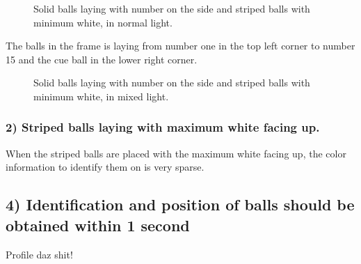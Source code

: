 \begin{figure}[H]
  \centering
\quad
\quad
   \caption{Solid balls laying with number on the side and striped balls with minimum white, in normal light.}
  \label{fig:numuplight}
\end{figure}

The balls in the frame is laying from number one in the top left corner to number 15 and the cue ball in the lower right corner.

\begin{figure}[H]
  \centering
\quad
\quad
   \caption{Solid balls laying with number on the side and striped balls with minimum white, in mixed light.}
  \label{fig:numupmixed}
\end{figure}


\subsubsection{2) Striped balls laying with maximum white facing up.}
When the striped balls are placed with the maximum white facing up, the color information to identify them on is very sparse.






\subsection{4) Identification and position of balls should be obtained within 1 second}

Profile daz shit!
